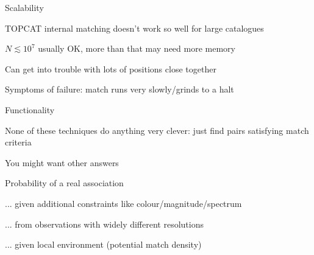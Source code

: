 \documentclass[20pt,landscape]{foils}
\begin{document}



\begin{list0}
  \item Scalability
  \begin{list2}
    \item TOPCAT internal matching doesn't work so well for large catalogues
    \begin{list3}
      \item $N \lesssim 10^{7}$ usually OK, more than that may need more memory
    \end{list3}
    \item Can get into trouble with lots of positions close together
    \item Symptoms of failure: match runs very slowly/grinds to a halt
  \end{list2}
  \item Functionality
  \begin{list2}
    \item None of these techniques do anything very clever:
          just find pairs satisfying match criteria
    \item You might want other answers
    \begin{list3}
      \item Probability of a real association
      \item ... given additional constraints like colour/magnitude/spectrum
      \item ... from observations with widely different resolutions
      \item ... given local environment (potential match density)
    \end{list3}
  \end{list2}
\end{list0}

\label{lastPage}

\newpage
\rightfooter{}
\MyLogo{}
\end{document}
